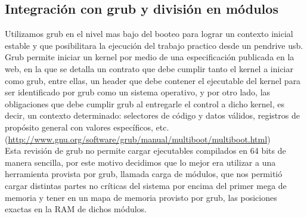 	 \subsection{Integración con grub y división en módulos}

	Utilizamos grub en el nivel mas bajo del booteo para lograr un contexto inicial estable y que posibilitara la ejecución del trabajo practico desde un pendrive usb.\\

	Grub permite iniciar un kernel por medio de una especificación publicada en la web, en la que se detalla un contrato que debe cumplir tanto el kernel a iniciar como grub, entre ellas, un header que debe contener el ejecutable del kernel para ser identificado por grub como un sistema operativo, y por otro lado, las obligaciones que debe cumplir grub al entregarle el control a dicho kernel, es decir, un contexto determinado: selectores de código y datos válidos, registros de propósito general con valores específicos, etc.\\
	(\url{http://www.gnu.org/software/grub/manual/multiboot/multiboot.html})\\

	Esta revisión de grub no permite cargar ejecutables compilados en 64 bits de manera sencilla, por este motivo decidimos que lo mejor era utilizar a una herramienta provista por grub, llamada carga de módulos, que nos permitió cargar distintas partes no críticas del sistema por encima del primer mega de memoria y tener en un mapa de memoria provisto por grub, las posiciones exactas en la RAM de dichos módulos.\\ 

